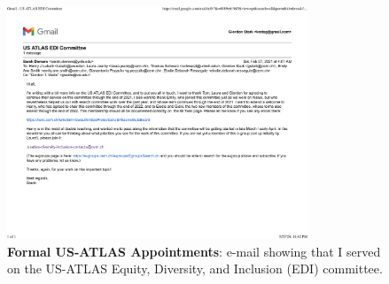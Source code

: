 \begin{figure}[h!]
	\centering
	\caption{\textbf{Formal US-ATLAS Appointments}: e-mail showing that I served on the US-ATLAS Equity, Diversity, and Inclusion (EDI) committee.}
	\includegraphics[width=0.80\textwidth]{attachments/F-leadership/usatlasEDICommittee}
\end{figure}

